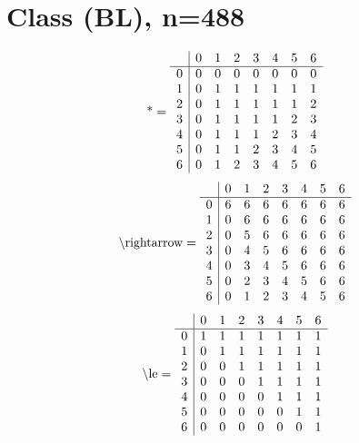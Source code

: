 \documentclass[11pt]{article}
\begin{document}
\section{Class (BL), n=488}
\[\text{*} = 
\begin{array}{r | r r r r r r r}
 & 0 & 1 & 2 & 3 & 4 & 5 & 6 \\ \hline
0 & 0 & 0 & 0 & 0 & 0 & 0 & 0 \\
1 & 0 & 1 & 1 & 1 & 1 & 1 & 1 \\
2 & 0 & 1 & 1 & 1 & 1 & 1 & 2 \\
3 & 0 & 1 & 1 & 1 & 1 & 2 & 3 \\
4 & 0 & 1 & 1 & 1 & 2 & 3 & 4 \\
5 & 0 & 1 & 1 & 2 & 3 & 4 & 5 \\
6 & 0 & 1 & 2 & 3 & 4 & 5 & 6 \\
\end{array}
\]
\[\text{\textbackslash rightarrow} = 
\begin{array}{r | r r r r r r r}
 & 0 & 1 & 2 & 3 & 4 & 5 & 6 \\ \hline
0 & 6 & 6 & 6 & 6 & 6 & 6 & 6 \\
1 & 0 & 6 & 6 & 6 & 6 & 6 & 6 \\
2 & 0 & 5 & 6 & 6 & 6 & 6 & 6 \\
3 & 0 & 4 & 5 & 6 & 6 & 6 & 6 \\
4 & 0 & 3 & 4 & 5 & 6 & 6 & 6 \\
5 & 0 & 2 & 3 & 4 & 5 & 6 & 6 \\
6 & 0 & 1 & 2 & 3 & 4 & 5 & 6 \\
\end{array}
\]
\[\text{\textbackslash le} = 
\begin{array}{r | r r r r r r r}
 & 0 & 1 & 2 & 3 & 4 & 5 & 6 \\ \hline
0 & 1 & 1 & 1 & 1 & 1 & 1 & 1 \\
1 & 0 & 1 & 1 & 1 & 1 & 1 & 1 \\
2 & 0 & 0 & 1 & 1 & 1 & 1 & 1 \\
3 & 0 & 0 & 0 & 1 & 1 & 1 & 1 \\
4 & 0 & 0 & 0 & 0 & 1 & 1 & 1 \\
5 & 0 & 0 & 0 & 0 & 0 & 1 & 1 \\
6 & 0 & 0 & 0 & 0 & 0 & 0 & 1 \\
\end{array}
\]
\end{document}
